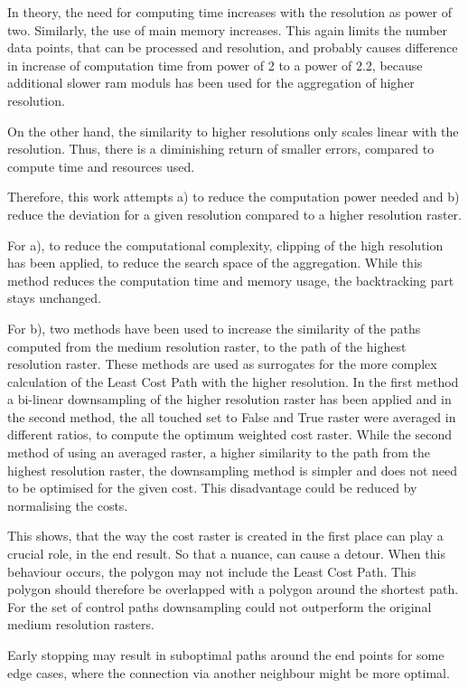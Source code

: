 In theory, the need for computing time increases with the resolution as power of two. 
Similarly, the use of main memory increases. 
This again limits the number data points, that can be processed and resolution, and probably causes difference in increase of computation time from power of 2 to a power of 2.2, because additional slower ram moduls has been used for the aggregation of higher resolution.

On the other hand, the similarity to higher resolutions only scales linear with the resolution. 
Thus, there is a diminishing return of smaller errors, compared to compute time and resources used.

Therefore, this work attempts a) to reduce the computation power needed and b) reduce the deviation for a given resolution compared to a higher resolution raster.

For a), to reduce the computational complexity, clipping of the high resolution has been applied, to reduce the search space of the aggregation.
While this method reduces the computation time and memory usage, the backtracking part stays unchanged.

For b), two methods have been used to increase the similarity of the paths computed from the medium resolution raster, to the path of the highest resolution raster.
These methods are used as surrogates for the more complex calculation of the Least Cost Path with the higher resolution.
In the first method a bi-linear downsampling of the higher resolution raster has been applied and in the second method, the all touched set to False and True raster were averaged in different ratios, to compute the optimum weighted cost raster.
While the second method of using an averaged raster, a higher similarity to the path from the highest resolution raster, the downsampling method is simpler and does not need to be optimised for the given cost.
This disadvantage could be reduced by normalising the costs.

This shows, that the way the cost raster is created in the first place can play a crucial role, in the end result.
So that a nuance, can cause a detour.
When this behaviour occurs, the polygon may not include the Least Cost Path.
This polygon should therefore be overlapped with a polygon around the shortest path.
For the set of control paths downsampling could not outperform the original medium resolution rasters.

Early stopping may result in suboptimal paths around the end points for some edge cases, where the connection via another neighbour might be more optimal.

